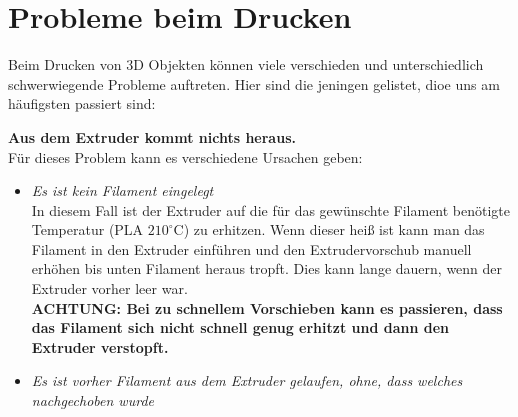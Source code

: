 \documentclass[10pt,a4paper]{scrartcl}
\begin{document}
\section{Probleme beim Drucken}

Beim Drucken von 3D Objekten können viele verschieden und unterschiedlich schwerwiegende Probleme auftreten. Hier sind die jeningen gelistet, dioe uns am häufigsten passiert sind:\\
\begin{description}
\item \textbf{Aus dem Extruder kommt nichts heraus.}\\
Für dieses Problem kann es verschiedene Ursachen geben:
\begin{itemize}
\item \textit{Es ist kein Filament eingelegt}\\
In diesem Fall ist der Extruder auf die für das gewünschte Filament benötigte Temperatur (PLA $210^\circ$C) zu erhitzen. Wenn dieser heiß ist kann man das Filament in den Extruder einführen und den Extrudervorschub manuell erhöhen bis unten Filament heraus tropft. Dies kann lange dauern, wenn der Extruder vorher leer war.\\
\textbf{ACHTUNG: Bei zu schnellem Vorschieben kann es passieren, dass das Filament sich nicht schnell genug erhitzt und dann den Extruder verstopft.}

\item \textit{Es ist vorher Filament aus dem Extruder gelaufen, ohne, dass welches nachgechoben wurde}\\

\end{itemize}
\end{description}
\end{document}
